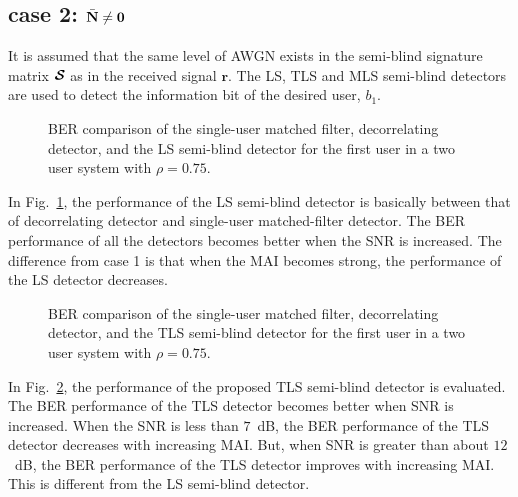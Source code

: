 \documentclass[10pt,fleqn,twocolumn]{IEEEtran}
\newcommand{\br}{{\mathbf r}}
\newcommand{\bN}{{\bf N}}
\newcommand{\bcS}{{\mbox {\boldmath ${\cal S}$}}}
\begin{document}
\subsection*{case 2: $\bar{\bN} \neq \mathbf{0}$}
It is assumed that the same level of AWGN exists in the semi-blind
signature matrix $\bcS$ as in the received signal $\br$.  The LS, TLS
and MLS semi-blind detectors are used to detect the information bit of
the desired user, $b_1$.
\begin{figure}
\caption{BER comparison of the single-user matched filter,
decorrelating detector, and the LS semi-blind detector for the
first user in a two user system with $\rho=0.75$.} \label{BER_LS1}
\end{figure}
In Fig.~\ref{BER_LS1}, the performance of the LS semi-blind detector is
basically between that of decorrelating detector and single-user
matched-filter detector. The BER performance of all the detectors
becomes better when the SNR is increased. The difference from case 1 is
that when the MAI becomes strong, the performance of the LS detector
decreases.

\begin{figure}
\caption{BER comparison of the single-user matched filter,
decorrelating detector, and the TLS semi-blind detector for the
first user in a two user system with $\rho=0.75$.} \label{BER_TLS}
\end{figure}
In Fig.~\ref{BER_TLS}, the performance of the proposed TLS
semi-blind detector is evaluated. The BER performance of the TLS
detector becomes better when SNR is increased.  When the SNR is less
than $7$~dB, the BER performance of the TLS detector decreases with
increasing MAI.  But, when SNR is greater than about $12$~dB, the BER
performance of the TLS detector improves with increasing MAI. This
is different from the LS semi-blind detector.
\end{document}
